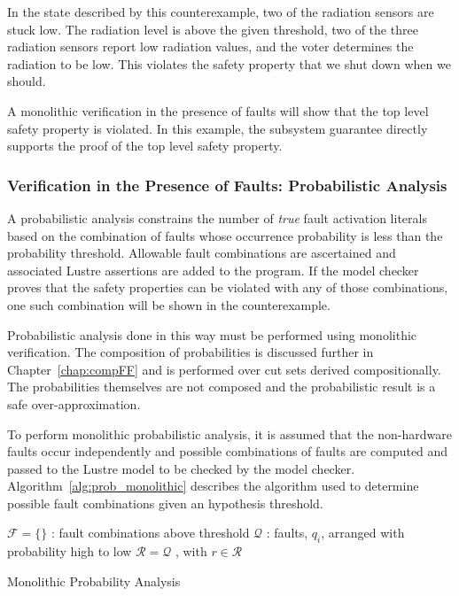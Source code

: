 In the state described by this counterexample, two of the radiation sensors are stuck low. The radiation level is above the given threshold, two of the three radiation sensors report low radiation values, and the voter determines the radiation to be low. This violates the safety property that we shut down when we should. 

A monolithic verification in the presence of faults will show that the top level safety property is violated. In this example, the subsystem guarantee directly supports the proof of the top level safety property. 

\subsubsection{Verification in the Presence of Faults: Probabilistic Analysis} 
A probabilistic analysis constrains the number of {\em true} fault activation literals based on the combination of faults whose occurrence probability is less than the probability threshold. Allowable fault combinations are ascertained and associated Lustre assertions are added to the program. If the model checker proves that the safety properties can be violated with any of those combinations, one such combination will be shown in the counterexample. 

Probabilistic analysis done in this way must be performed using monolithic verification. The composition of probabilities is discussed further in Chapter~\ref{chap:compFF} and is performed over cut sets derived compositionally. The probabilities themselves are not composed and the probabilistic result is a safe over-approximation. 

To perform monolithic probabilistic analysis, it is assumed that the non-hardware faults occur independently and possible combinations of faults are computed and passed to the Lustre model to be checked by the model checker. Algorithm~\ref{alg:prob_monolithic} describes the algorithm used to determine possible fault combinations given an hypothesis threshold.

\begin{algorithm}[h!]
	$\mathcal{F} = \{\}$ : fault combinations above threshold \;
	$\mathcal{Q}$ : faults, $q_i$, arranged with probability high to low \;
	$\mathcal{R} = \mathcal{Q}$ , with $r \in \mathcal{R}$\;
	\caption{Monolithic Probability Analysis}
	\label{alg:prob_monolithic}
\end{algorithm}

